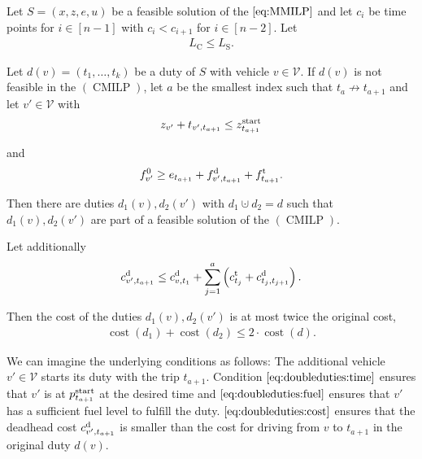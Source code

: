 \begin{lemma}
\label{lem:doubleduties}

Let $S=\left(x,z,e,u\right)$ be a feasible solution of the $\eqref{eq:MMILP}$ and let $c_i$ be time points for $i\in[n-1]$ with ${c_i<c_{i+1}}$ for ${i\in[n-2]}$. Let
\begin{align}
	L_{\operatorname{C}}\leq L_{\operatorname{S}}. \label{eq:LCLS}
\end{align}

Let ${d(v)=\left(t_1,\dots,t_k\right)}$ be a duty of $S$ with vehicle $v\in\mathcal{V}$. If $d(v)$ is not feasible in the $(\operatorname{CMILP})$, let $a$ be the smallest index such that ${t_a\not\to t_{a+1}}$ and let ${v'\in\mathcal{V}}$ with
\begin{align}
	z_{v'} + t_{v',t_{a+1}}\leq z^{\operatorname{start}}_{t_{a+1}}\label{eq:doubleduties:time}
\end{align}

and
\begin{align}
	f^0_{v'}\geq e_{t_{a+1}} + f^{\operatorname{d}}_{v',t_{a+1}} + f^{\operatorname{t}}_{t_{a+1}}.\label{eq:doubleduties:fuel}
\end{align}

Then there are duties $d_1(v),d_2\left(v'\right)$ with ${d_1\cupdot d_2=d}$ such that $d_1(v),d_2(v')$ are part of a feasible solution of the $(\operatorname{CMILP})$.

Let additionally
\begin{align}
	c^{\operatorname{d}}_{v',t_{a+1}}\leq c^{\operatorname{d}}_{v,t_1} + \sum_{j=1}^a \left(c^{\operatorname{t}}_{t_j} + c^{\operatorname{d}}_{t_j,t_{j+1}}\right). \label{eq:doubleduties:cost}
\end{align}

Then the cost of the duties $d_1(v),d_2(v')$ is at most twice the original cost, \ie
\begin{align*}
	\operatorname{cost}\left(d_1\right) + \operatorname{cost}\left(d_2\right) \leq 2\cdot\operatorname{cost}\left(d\right).
\end{align*}

\end{lemma}

We can imagine the underlying conditions as follows: The additional vehicle $v'\in\mathcal{V}$ starts its duty with the trip $t_{a+1}$. Condition $\eqref{eq:doubleduties:time}$ ensures that $v'$ is at $p^{\operatorname{start}}_{t_{a+1}}$ at the desired time and $\eqref{eq:doubleduties:fuel}$ ensures that $v'$ has a sufficient fuel level to fulfill the duty. $\eqref{eq:doubleduties:cost}$ ensures that the deadhead cost $c^{\operatorname{d}}_{v',t_{a+1}}$ is smaller than the cost for driving from $v$ to $t_{a+1}$ in the original duty $d(v)$.

